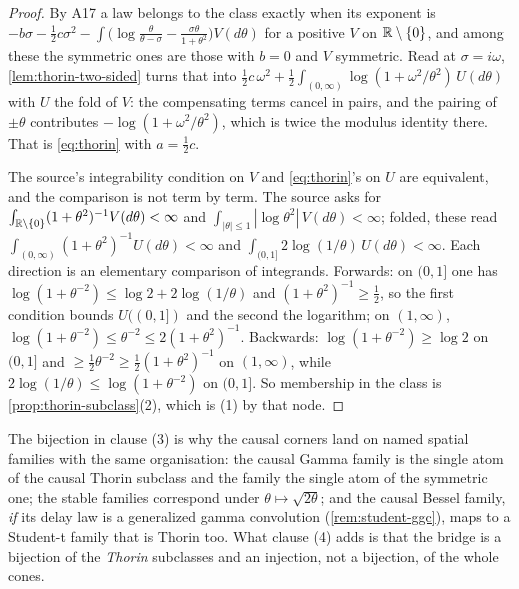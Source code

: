 \begin{proof}
By A17 a law belongs to the class exactly when its exponent is
$-b\sigma - \tfrac12 c\sigma^2 - \int\bigl(\log\tfrac{\theta}{\theta-\sigma}
- \tfrac{\sigma\theta}{1+\theta^2}\bigr)V(d\theta)$ for a positive $V$ on $\mathbb{R}\setminus\{0\}$,
and among these the symmetric ones are those with $b = 0$ and $V$ symmetric. Read at
$\sigma = i\omega$, \ref{lem:thorin-two-sided} turns that into
$\tfrac12 c\,\omega^2 + \tfrac12\int_{(0,\infty)}\log(1 + \omega^2/\theta^2)\,U(d\theta)$ with
$U$ the fold of $V$: the compensating terms cancel in pairs, and the pairing of $\pm\theta$
contributes $-\log(1 + \omega^2/\theta^2)$, which is twice the modulus identity there. That is
\ref{eq:thorin} with $a = \tfrac12 c$.

The source's integrability condition on $V$ and \ref{eq:thorin}'s on $U$ are equivalent, and the
comparison is not term by term. The source asks for
$\int_{\mathbb{R}\setminus\{0\}}(1+\theta^2)^{-1}V(d\theta) < \infty$ and
$\int_{|\theta|\le1}|\log\theta^2|\,V(d\theta) < \infty$; folded, these read
$\int_{(0,\infty)}(1+\theta^2)^{-1}U(d\theta) < \infty$ and
$\int_{(0,1]}2\log(1/\theta)\,U(d\theta) < \infty$. Each direction is an elementary comparison of
integrands. Forwards: on $(0,1]$ one has $\log(1+\theta^{-2}) \le \log 2 + 2\log(1/\theta)$ and
$(1+\theta^2)^{-1} \ge \tfrac12$, so the first condition bounds $U((0,1])$ and the second the
logarithm; on $(1,\infty)$, $\log(1+\theta^{-2}) \le \theta^{-2} \le 2(1+\theta^2)^{-1}$.
Backwards: $\log(1+\theta^{-2}) \ge \log 2$ on $(0,1]$ and
$\ge \tfrac12\theta^{-2} \ge \tfrac12(1+\theta^2)^{-1}$ on $(1,\infty)$, while
$2\log(1/\theta) \le \log(1+\theta^{-2})$ on $(0,1]$. So membership in the class is
\ref{prop:thorin-subclass}(2), which is (1) by that node.
\end{proof}

The bijection in clause (3) is why the causal corners land on named spatial families with the
same organisation: the causal Gamma family is the single atom of the causal Thorin subclass and
the \Matern{} family the single atom of the symmetric one; the stable families correspond under
$\theta \mapsto \sqrt{2\theta}$; and the causal Bessel family, \emph{if} its delay law is a
generalized gamma convolution (\ref{rem:student-ggc}), maps to a Student-t family that is Thorin
too. What clause (4) adds is that the bridge is a bijection of the
\emph{Thorin} subclasses and an injection, not a bijection, of the whole cones.

